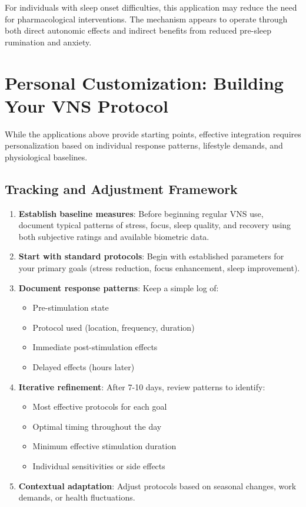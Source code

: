 \documentclass[
  Letterpaper,
]{scrbook}
\providecommand{\tightlist}{%
  \setlength{\itemsep}{0pt}\setlength{\parskip}{0pt}}\usepackage{longtable,booktabs,array}
\begin{document}
For individuals with sleep onset difficulties, this application may
reduce the need for pharmacological interventions. The mechanism appears
to operate through both direct autonomic effects and indirect benefits
from reduced pre-sleep rumination and anxiety.

\section{Personal Customization: Building Your VNS
Protocol}\label{personal-customization-building-your-vns-protocol}

While the applications above provide starting points, effective
integration requires personalization based on individual response
patterns, lifestyle demands, and physiological baselines.

\subsection{Tracking and Adjustment
Framework}\label{tracking-and-adjustment-framework}

\begin{enumerate}
\def\labelenumi{\arabic{enumi}.}
\item
  \textbf{Establish baseline measures}: Before beginning regular VNS
  use, document typical patterns of stress, focus, sleep quality, and
  recovery using both subjective ratings and available biometric data.
\item
  \textbf{Start with standard protocols}: Begin with established
  parameters for your primary goals (stress reduction, focus
  enhancement, sleep improvement).
\item
  \textbf{Document response patterns}: Keep a simple log of:

  \begin{itemize}
  \tightlist
  \item
    Pre-stimulation state
  \item
    Protocol used (location, frequency, duration)
  \item
    Immediate post-stimulation effects
  \item
    Delayed effects (hours later)
  \end{itemize}
\item
  \textbf{Iterative refinement}: After 7-10 days, review patterns to
  identify:

  \begin{itemize}
  \tightlist
  \item
    Most effective protocols for each goal
  \item
    Optimal timing throughout the day
  \item
    Minimum effective stimulation duration
  \item
    Individual sensitivities or side effects
  \end{itemize}
\item
  \textbf{Contextual adaptation}: Adjust protocols based on seasonal
  changes, work demands, or health fluctuations.
\end{enumerate}
\end{document}
